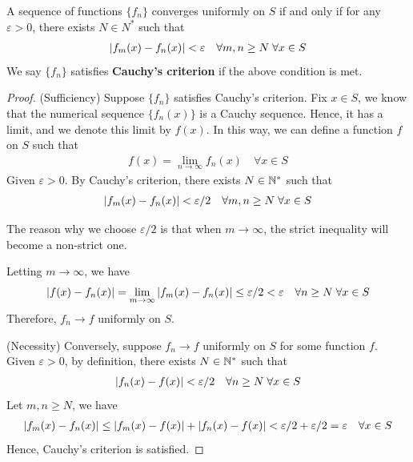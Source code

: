 \documentclass[thmcnt=section, 12pt]{my-elegantbook}
\begin{document}
\begin{theorem} \label{thm:42}
    A sequence of functions $\{f_n\}$ converges uniformly on $S$ if and only if for any $\varepsilon > 0$, there exists $N \in N^\ast$ such that 
    \begin{align*}
        \left\lvert f_m(x) - f_n(x) \right\rvert < \varepsilon
        \quad \forall m, n \geq N \;
        \forall x \in S
    \end{align*}
    We say $\{f_n\}$ satisfies \textbf{Cauchy's criterion} if the above condition is met.
\end{theorem}

\begin{proof}
    (Sufficiency) Suppose $\{f_n\}$ satisfies Cauchy's criterion. Fix $x \in S$, we know that the numerical sequence $\{f_n(x)\}$ is a Cauchy sequence. Hence, it has a limit, and we denote this limit by $f(x)$. In this way, we can define a function $f$ on $S$ such that 
    \begin{align*}
        f(x) = \lim_{n \to \infty} f_n(x)
        \quad \forall x \in S
    \end{align*}
    Given $\varepsilon > 0$. By Cauchy's criterion, there exists $N \in \mathbb{N}^\ast$ such that 
    \begin{align*}
        \left\lvert f_m(x) - f_n(x) \right\rvert < \varepsilon / 2
        \quad \forall m, n \geq N \;
        \forall x \in S
    \end{align*}
    \begin{note}
        The reason why we choose $\varepsilon / 2$ is that when $m \to \infty$, the strict inequality will become a non-strict one.
    \end{note}
    Letting $m \to \infty$, we have
    \begin{align*}
        \left\lvert f(x) - f_n(x) \right\rvert
        = \lim_{m \to \infty} \left\lvert f_m(x) - f_n(x) \right\rvert \leq \varepsilon / 2
        < \varepsilon
        \quad \forall n \geq N \;
        \forall x \in S
    \end{align*}
    Therefore, $f_n \to f$ uniformly on $S$.

    (Necessity) Conversely, suppose $f_n \to f$ uniformly on $S$ for some function $f$. Given $\varepsilon > 0$, by definition, there exists $N \in \mathbb{N}^\ast$ such that 
    \begin{align*}
        \left\lvert f_n(x) - f(x) \right\rvert < \varepsilon / 2
        \quad \forall n \geq N \; 
        \forall x \in S
    \end{align*}
    Let $m, n \geq N$, we have 
    \begin{align*}
        \left\lvert f_m(x) - f_n(x) \right\rvert
        \leq \left\lvert f_m(x) - f(x) \right\rvert
        + \left\lvert f_n(x) - f(x) \right\rvert
        < \varepsilon / 2 + \varepsilon / 2
        = \varepsilon
        \quad \forall x \in S
    \end{align*}
    Hence, Cauchy's criterion is satisfied.
\end{proof}
\end{document}
